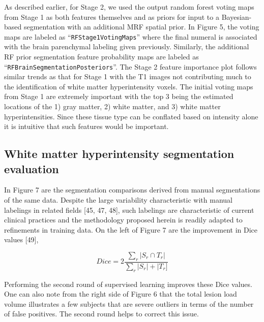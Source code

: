 \documentclass[11pt,]{article}
\begin{document}
As described earlier, for Stage 2, we used the output random forest
voting maps from Stage 1 as both features themselves and as priors for
input to a Bayesian-based segmentation with an additional MRF spatial
prior. In Figure 5, the voting maps are labeled as
``\texttt{RFStage1VotingMaps}'' where the final numeral is associated
with the brain parenchymal labeling given previously. Similarly, the
additional RF prior segmentation feature probability maps are labeled as
``\texttt{RFBrainSegmentationPosteriors}''. The Stage 2 feature
importance plot follows similar trends as that for Stage 1 with the T1
images not contributing much to the identification of white matter
hyperintensity voxels. The initial voting maps from Stage 1 are
extremely important with the top 3 being the estimated locations of the
1) gray matter, 2) white matter, and 3) white matter hyperintensities.
Since these tissue type can be conflated based on intensity alone it is
intuitive that such features would be important.

\subsection{White matter hyperintensity segmentation
evaluation}\label{white-matter-hyperintensity-segmentation-evaluation}

In Figure 7 are the segmentation comparisons derived from manual
segmentations of the same data. Despite the large variability
characteristic with manual labelings in related fields {[}45, 47, 48{]},
such labelings are characteristic of current clinical practices and the
methodology proposed herein is readily adapted to refinements in
training data. On the left of Figure 7 are the improvement in Dice
values {[}49{]}, 

\[ Dice = 2 \frac{\sum_r|S_r \cap T_r|}{\sum_r|S_r| + |T_r] } \]

Performing the second round of supervised learning improves these Dice
values. One can also note from the right side of Figure 6 that the total
lesion load volume illustrates a few subjects that are severe outliers
in terms of the number of false positives. The second round helps to
correct this issue.
\end{document}

